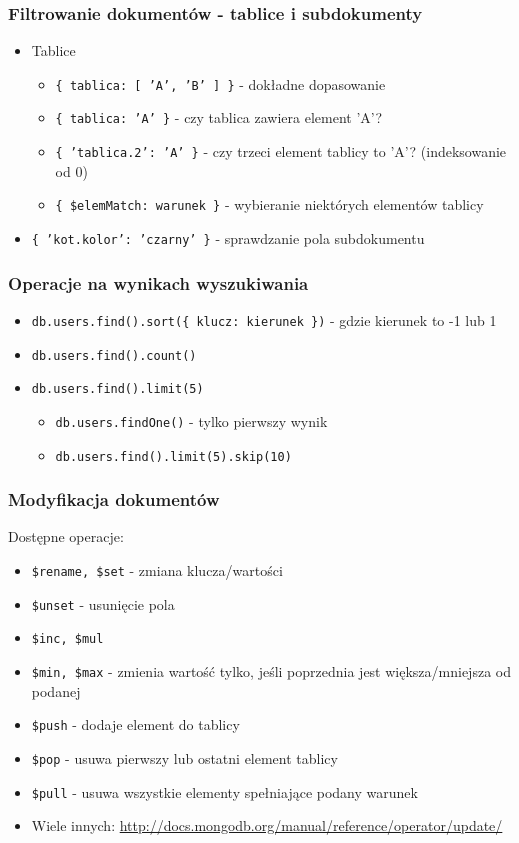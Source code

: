 \documentclass{beamer}
\begin{document}
  \begin{frame}
    \frametitle{Filtrowanie dokumentów - tablice i subdokumenty}
    \begin{itemize}
      \item Tablice
      \begin{itemize}
        \item \texttt{\{ tablica: [ 'A', 'B' ] \}} - dokładne dopasowanie
        \item \texttt{\{ tablica: 'A' \}} - czy tablica zawiera element 'A'?
        \item \texttt{\{ 'tablica.2': 'A' \}} - czy trzeci element tablicy to 'A'? (indeksowanie od 0)
        \item \texttt{\{ \$elemMatch: warunek \}} - wybieranie niektórych elementów tablicy
      \end{itemize}
      \item \texttt{\{ 'kot.kolor': 'czarny' \}} - sprawdzanie pola subdokumentu
      
    \end{itemize}
  \end{frame}

  \begin{frame}
    \frametitle{Operacje na wynikach wyszukiwania}
    \begin{itemize}
      \item \texttt{db.users.find().sort(\{ klucz: kierunek \})} - gdzie kierunek to -1 lub 1
      \item \texttt{db.users.find().count()}
      \item \texttt{db.users.find().limit(5)}
      \begin{itemize}
        \item \texttt{db.users.findOne()} - tylko pierwszy wynik
        \item \texttt{db.users.find().limit(5).skip(10)}
      \end{itemize}
    \end{itemize}
  \end{frame}

  \begin{frame}
    \frametitle{Modyfikacja dokumentów}
    Dostępne operacje:
    \begin{itemize}
      \item \texttt{\$rename, \$set} - zmiana klucza/wartości
      \item \texttt{\$unset} - usunięcie pola
      \item \texttt{\$inc, \$mul}
      \item \texttt{\$min, \$max} - zmienia wartość tylko, jeśli poprzednia jest większa/mniejsza od podanej
      \item \texttt{\$push} - dodaje element do tablicy
      \item \texttt{\$pop} - usuwa pierwszy lub ostatni element tablicy
      \item \texttt{\$pull} - usuwa wszystkie elementy spełniające podany warunek
      \item Wiele innych: \url{http://docs.mongodb.org/manual/reference/operator/update/}
    \end{itemize}
  \end{frame}
\end{document}
